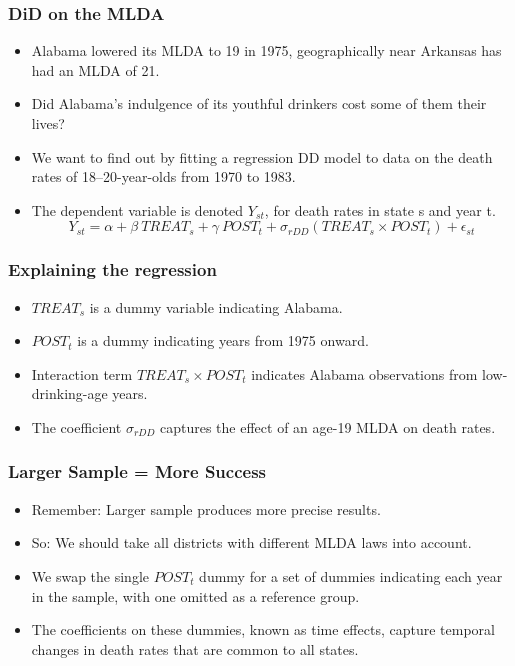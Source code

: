 \documentclass{beamer}
\begin{document}
\begin{frame}
\frametitle{DiD on the MLDA}
\begin{itemize}
	\item Alabama lowered its MLDA to 19 in 1975, geographically near Arkansas has had an MLDA of 21.
	\item Did Alabama’s indulgence of its youthful drinkers cost some of them their lives? 
	\item We want to find out by fitting a regression DD model to data on the death rates of 18–20-year-olds from 1970 to 1983. 
	\item The dependent variable is denoted $Y_{st}$, for death rates in state s and year t.
$$Y_{st}=\alpha + \beta~ TREAT_s + \gamma ~POST_t + \sigma_{rDD} (TREAT_s \times POST_t) + \epsilon_{st}$$

\end{itemize}

\end{frame}


\begin{frame}
\frametitle{Explaining the regression}
\begin{itemize}
	\item $TREAT_s$ is a dummy variable indicating Alabama. 
	\item $POST_t$ is a dummy indicating years from 1975 onward.
	\item Interaction term $TREAT_s \times POST_t$ indicates Alabama observations from low-drinking-age years. 
	\item The coefficient $\sigma_{rDD}$ captures the effect of an age-19 MLDA on death rates.
\end{itemize}
\end{frame}


\begin{frame}
\frametitle{Larger Sample = More Success}
\begin{itemize}
	\item Remember: Larger sample produces more precise results.
	\item So: We should take all districts with different MLDA laws into account.
	\item We swap the single $POST_t$ dummy for a set of dummies indicating each year in the sample, with one omitted as a reference group. 
	\item The coefficients on these dummies, known as time effects, capture temporal changes in death rates that are common to all states.
\end{itemize}


\end{frame}
\end{document}

